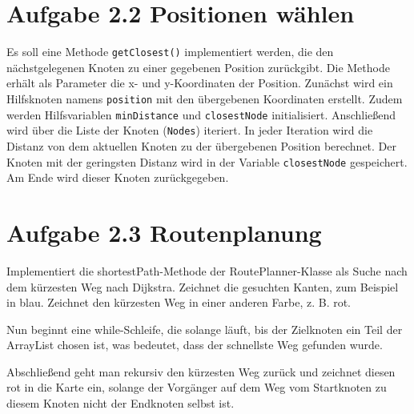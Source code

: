 \documentclass{pi2}
\begin{document}
\section*{Aufgabe 2.2 Positionen wählen}
Es soll eine Methode \texttt{getClosest()} implementiert werden, die den nächstgelegenen Knoten zu einer gegebenen Position zurückgibt. Die Methode erhält als Parameter die x- und y-Koordinaten der Position. Zunächst wird ein Hilfsknoten namens \texttt{position} mit den übergebenen Koordinaten erstellt. Zudem werden Hilfsvariablen \texttt{minDistance} und \texttt{closestNode} initialisiert. Anschließend wird über die Liste der Knoten (\texttt{Nodes}) iteriert. In jeder Iteration wird die Distanz von dem aktuellen Knoten zu der übergebenen Position berechnet. Der Knoten mit der geringsten Distanz wird in der Variable \texttt{closestNode} gespeichert. Am Ende wird dieser Knoten zurückgegeben.


\section*{Aufgabe 2.3 Routenplanung}

Implementiert die shortestPath-Methode der RoutePlanner-Klasse als Suche nach dem kürzesten Weg nach Dijkstra. Zeichnet die gesuchten Kanten, zum Beispiel in blau. Zeichnet den kürzesten Weg in einer anderen Farbe, z. B. rot. 



Nun beginnt eine while-Schleife, die solange läuft, bis der Zielknoten ein Teil der ArrayList chosen ist, was bedeutet, dass der schnellste Weg gefunden wurde.


Abschließend geht man rekursiv den kürzesten Weg zurück und zeichnet diesen rot in die Karte ein, solange der Vorgänger auf dem Weg vom Startknoten zu diesem Knoten nicht der Endknoten selbst ist.

\end{document}
